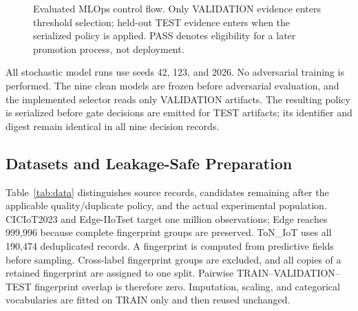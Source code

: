 \documentclass[runningheads]{llncs}
\begin{document}
\begin{figure}[t]
{
}
\caption{Evaluated MLOps control flow. Only VALIDATION evidence enters threshold selection; held-out TEST evidence enters when the serialized policy is applied. PASS denotes eligibility for a later promotion process, not deployment.}
\label{fig:pipeline}
\end{figure}

All stochastic model runs use seeds 42, 123, and 2026. No adversarial training is performed. The nine clean models are frozen before adversarial evaluation, and the implemented selector reads only VALIDATION artifacts. The resulting policy is serialized before gate decisions are emitted for TEST artifacts; its identifier and digest remain identical in all nine decision records.

\subsection{Datasets and Leakage-Safe Preparation}
Table~\ref{tab:data} distinguishes source records, candidates remaining after the applicable quality/duplicate policy, and the actual experimental population. CICIoT2023 and Edge-IIoTset target one million observations; Edge reaches 999,996 because complete fingerprint groups are preserved. ToN\_IoT uses all 190,474 deduplicated records. A fingerprint is computed from predictive fields before sampling. Cross-label fingerprint groups are excluded, and all copies of a retained fingerprint are assigned to one split. Pairwise TRAIN--VALIDATION--TEST fingerprint overlap is therefore zero. Imputation, scaling, and categorical vocabularies are fitted on TRAIN only and then reused unchanged.
\end{document}
